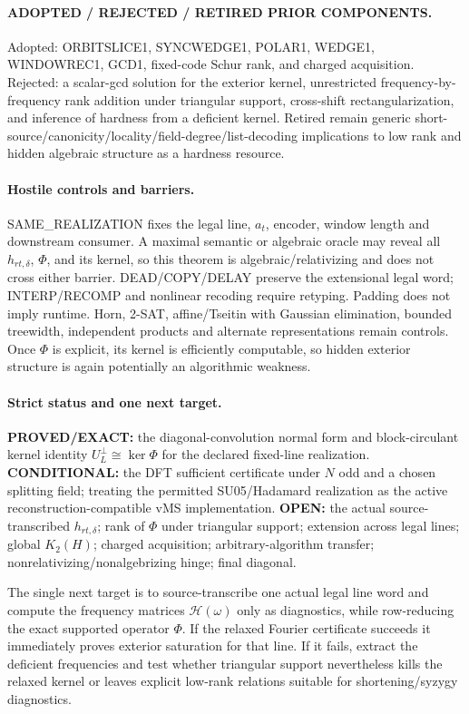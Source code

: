 \documentclass[11pt]{article}
\begin{document}
\paragraph{ADOPTED / REJECTED / RETIRED PRIOR COMPONENTS.}
Adopted: ORBITSLICE1, SYNCWEDGE1, POLAR1, WEDGE1, WINDOWREC1, GCD1, fixed-code Schur rank, and charged acquisition. Rejected: a scalar-gcd solution for the exterior kernel, unrestricted frequency-by-frequency rank addition under triangular support, cross-shift rectangularization, and inference of hardness from a deficient kernel. Retired remain generic short-source/canonicity/locality/field-degree/list-decoding implications to low rank and hidden algebraic structure as a hardness resource.

\paragraph{Hostile controls and barriers.}
SAME\_REALIZATION fixes the legal line, \(a_t\), encoder, window length and downstream consumer. A maximal semantic or algebraic oracle may reveal all \(h_{rt,\delta}\), \(\Phi\), and its kernel, so this theorem is algebraic/relativizing and does not cross either barrier. DEAD/COPY/DELAY preserve the extensional legal word; INTERP/RECOMP and nonlinear recoding require retyping. Padding does not imply runtime. Horn, 2-SAT, affine/Tseitin with Gaussian elimination, bounded treewidth, independent products and alternate representations remain controls. Once \(\Phi\) is explicit, its kernel is efficiently computable, so hidden exterior structure is again potentially an algorithmic weakness.

\paragraph{Strict status and one next target.}
\textbf{PROVED/EXACT:} the diagonal-convolution normal form and block-circulant kernel identity \(U_L^\perp\cong\ker\Phi\) for the declared fixed-line realization.
\textbf{CONDITIONAL:} the DFT sufficient certificate under \(N\) odd and a chosen splitting field; treating the permitted SU05/Hadamard realization as the active reconstruction-compatible vMS implementation.
\textbf{OPEN:} the actual source-transcribed \(h_{rt,\delta}\); rank of \(\Phi\) under triangular support; extension across legal lines; global \(K_2(H)\); charged acquisition; arbitrary-algorithm transfer; nonrelativizing/nonalgebrizing hinge; final diagonal.

The single next target is to source-transcribe one actual legal line word and compute the frequency matrices \(\mathcal H(\omega)\) only as diagnostics, while row-reducing the exact supported operator \(\Phi\). If the relaxed Fourier certificate succeeds it immediately proves exterior saturation for that line. If it fails, extract the deficient frequencies and test whether triangular support nevertheless kills the relaxed kernel or leaves explicit low-rank relations suitable for shortening/syzygy diagnostics.
\end{document}
